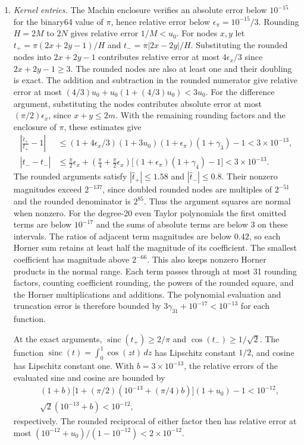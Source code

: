 \begin{enumerate}
\item \emph{Kernel entries.} The Machin enclosure verifies an absolute
error below $10^{-15}$ for the binary64 value of $\pi$, hence relative
error below $\epsilon_\pi=10^{-15}/3$. Rounding $H=2M$ to $2N$ gives
relative error $1/M<u_0$. For nodes $x,y$ let $t_+=\pi(2x+2y-1)/H$
and $t_-=\pi|2x-2y|/H$. Substituting the rounded nodes into $2x+2y-1$
contributes relative error at most $4\epsilon_x/3$ since $2x+2y-1\ge3$.
The rounded nodes are also at least one and their doubling is exact.
The addition and subtraction in the rounded numerator give relative error
at most $(4/3)u_0+u_0(1+(4/3)u_0)<3u_0$. For the difference argument,
substituting the nodes contributes absolute error at most
$(\pi/2)\epsilon_x$, since $x+y\le2m$. With the remaining rounding factors
and the enclosure of $\pi$, these estimates give
\begin{align*}
 \left|\frac{\widehat t_+}{t_+}-1\right|
 &\le (1+4\epsilon_x/3)(1+3u_0)(1+\epsilon_\pi)(1+\gamma_3)-1
 <3\times10^{-13},\\
 |\widehat t_--t_-|
 &\le \tfrac\pi2\epsilon_x+
     (\tfrac\pi4+\tfrac\pi2\epsilon_x)
     \bigl[(1+\epsilon_\pi)(1+\gamma_4)-1\bigr]
 <3\times10^{-13}.
\end{align*}
The rounded arguments satisfy $|\widehat t_+|\le1.58$ and
$|\widehat t_-|\le0.8$. Their nonzero magnitudes exceed $2^{-137}$,
since doubled rounded nodes are multiples of $2^{-51}$ and the rounded
denominator is $2^{85}$. Thus the argument squares are normal when nonzero.
For the degree-20 even Taylor polynomials the first omitted terms are
below $10^{-17}$ and the sums of absolute terms are below $3$ on these
intervals. The ratios of adjacent term magnitudes are below $0.42$,
so each Horner sum retains at least half the magnitude of its coefficient.
The smallest coefficient has magnitude above $2^{-66}$. This also keeps
nonzero Horner products in the normal range. Each term passes through
at most 31 rounding factors, counting coefficient rounding, the powers
of the rounded square, and the Horner multiplications and additions.
The polynomial evaluation and truncation error is therefore bounded by
$3\gamma_{31}+10^{-17}<10^{-13}$ for each function.

At the exact arguments, $\operatorname{sinc}(t_+)\ge2/\pi$ and
$\cos(t_-)\ge1/\sqrt2$. The function
$\operatorname{sinc}(t)=\int_0^1\cos(zt)\,dz$ has Lipschitz constant
$1/2$, and cosine has Lipschitz constant one. With $b=3\times10^{-13}$,
the relative errors of the evaluated sine and cosine are bounded by
\begin{align*}
 &(1+b)\bigl[1+(\pi/2)(10^{-13}+(\pi/4)b)\bigr](1+u_0)-1
   <10^{-12},\\
 &\sqrt2(10^{-13}+b)<10^{-12},
\end{align*}
respectively. The rounded reciprocal of either factor then has relative
error at most $(10^{-12}+u_0)/(1-10^{-12})<2\times10^{-12}$.


\end{enumerate}
